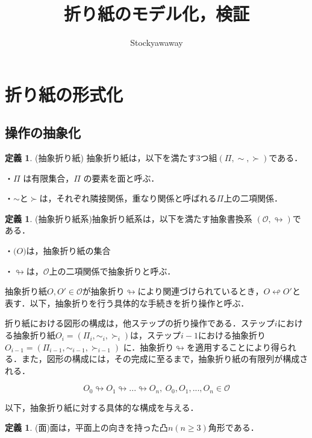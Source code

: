 \documentclass[uplatex,dvipdfmx,ja=standard]{bxjsarticle}
\title{折り紙のモデル化，検証}
\author{Stockyawaway}
\theoremstyle{definition}
\newtheorem{definition}[theorem]{定義}
\numberwithin{theorem}{section}  %
\numberwithin{equation}{section} %
\begin{document}
\maketitle
%
%
\section{折り紙の形式化}

\subsection{操作の抽象化}

\begin{definition}
    (抽象折り紙) 抽象折り紙は，以下を満たす3つ組$( \Pi , \sim , \succ )$である．
\end{definition}

    ・$\Pi$ は有限集合，$\Pi$ の要素を面と呼ぶ．

    ・$\sim$と$\succ$は，それぞれ隣接関係，重なり関係と呼ばれる$\Pi$上の二項関係．


\begin{definition}
    (抽象折り紙系)抽象折り紙系は，以下を満たす抽象書換系 $ (\mathcal{O} ,\looparrowright) $である．
\end{definition}
    
    ・$\mathcal(O)$は，抽象折り紙の集合

    ・$\looparrowright$は，$\mathcal{O}$上の二項関係で抽象折りと呼ぶ．

抽象折り紙$O,O' \in \mathcal{O}$が抽象折り$\looparrowright$により関連づけられているとき，$O \looparrowleft O'$と表す．以下，抽象折りを行う具体的な手続きを折り操作と呼ぶ．

折り紙における図形の構成は，他ステップの折り操作である．ステップ$i$における抽象折り紙$O_i = (\Pi_i , \sim_i , \succ_i)$は，ステップ$i-1$における抽象折り$O_{i-1} = (\Pi_{i-1} , \sim_{i-1} , \succ_{i-1})$ に．抽象折り$\looparrowright$を適用することにより得られる．また，図形の構成には，その完成に至るまで，抽象折り紙の有限列が構成される．

\begin{displaymath}
    O_0 \looparrowright O_1 \looparrowright ... \looparrowright O_n, \: O_0,O_1,...,O_n \in \mathcal{O}
\end{displaymath}


以下，抽象折り紙に対する具体的な構成を与える．

\begin{definition}
    (面)面は，平面上の向きを持った凸$n(n \geq 3)$角形である．
\end{definition}
\end{document}
